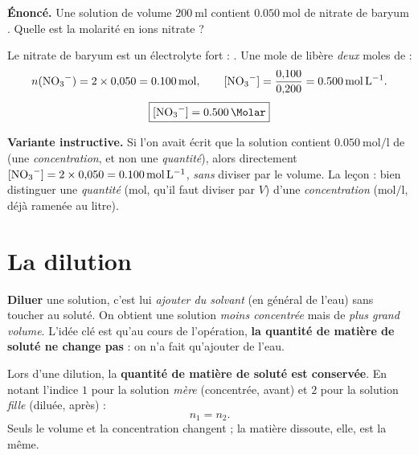 \documentclass[11pt,a4paper]{article}
\begin{document}
\begin{exemple}
\textbf{Énoncé.} Une solution de volume $\SI{200}{\milli\litre}$ contient $\SI{0.050}{\mole}$ de
nitrate de baryum . Quelle est la molarité en ions nitrate  ?

\smallskip
Le nitrate de baryum est un électrolyte fort : . Une mole de
 libère \emph{deux} moles de  :
\[ n(\ce{NO3-}) = 2\times 0{,}050 = \SI{0.100}{\mole},\qquad
   [\ce{NO3-}] = \frac{0{,}100}{0{,}200} = \SI{0.500}{\mole\per\litre}. \]
\[ \boxed{[\ce{NO3-}] = \SI{0.500}{\Molar}} \]

\smallskip
\textbf{Variante instructive.} Si l'on avait écrit que la solution contient $\SI{0.050}{\mole\per\litre}$
de  (une \emph{concentration}, et non une \emph{quantité}), alors directement
$[\ce{NO3-}] = 2\times 0{,}050 = \SI{0.100}{\mole\per\litre}$, \emph{sans} diviser par le volume. La
leçon : bien distinguer une \emph{quantité} ($\si{\mole}$, qu'il faut diviser par $V$) d'une
\emph{concentration} ($\si{\mole\per\litre}$, déjà ramenée au litre).
\end{exemple}

\section{La dilution}
\textbf{Diluer} une solution, c'est lui \emph{ajouter du solvant} (en général de l'eau) sans toucher
au soluté. On obtient une solution \emph{moins concentrée} mais de \emph{plus grand volume}. L'idée
clé est qu'au cours de l'opération, \textbf{la quantité de matière de soluté ne change pas} : on n'a
fait qu'ajouter de l'eau.

\begin{theoreme}
Lors d'une dilution, la \textbf{quantité de matière de soluté est conservée}. En notant l'indice $1$
pour la solution \emph{mère} (concentrée, avant) et $2$ pour la solution \emph{fille} (diluée, après) :
\[ n_1 = n_2. \]
Seuls le volume et la concentration changent ; la matière dissoute, elle, est la même.
\end{theoreme}
\end{document}
